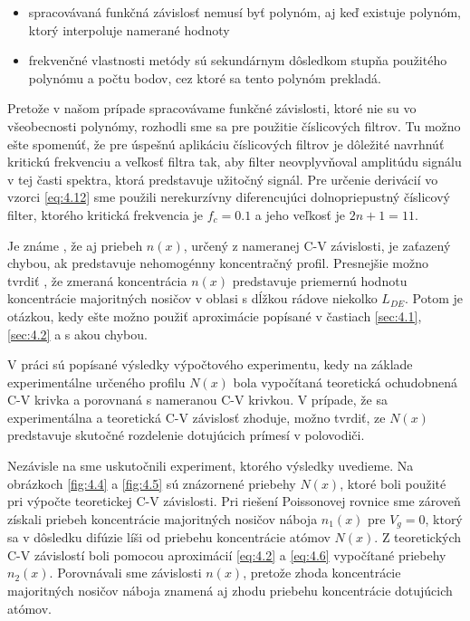 \begin{itemize}
\item spracovávaná funkčná závislosť nemusí byť polynóm, aj keď
  existuje polynóm, ktorý interpoluje namerané hodnoty
\item frekvenčné vlastnosti metódy sú sekundárnym dôsledkom stupňa
  použitého polynómu a počtu bodov, cez ktoré sa tento polynóm
  prekladá.
\end{itemize}

\par Pretože v našom prípade spracovávame funkčné závislosti, ktoré
nie su vo všeobecnosti polynómy, rozhodli sme sa pre použitie
číslicových filtrov. Tu možno ešte spomenúť, že pre úspešnú aplikáciu
číslicových filtrov je dôležité navrhnúť kritickú frekvenciu a veľkosť
filtra tak, aby filter neovplyvňoval amplitúdu signálu v tej časti
spektra, ktorá predstavuje užitočný signál. Pre určenie derivácií vo
vzorci \ref{eq:4.12} sme použili nerekurzívny diferencujúci
dolnopriepustný číslicový filter, ktorého kritická frekvencia je
$f_{c}=0.1$ a jeho veľkosť je $2n+1=11$.

\par Je známe \cite{4.18}, že aj priebeh $n(x)$, určený z nameranej
C-V závislosti, je zaťazený chybou, ak predstavuje nehomogénny
koncentračný profil. Presnejšie možno tvrdiť \cite{4.3}, že zmeraná
koncentrácia $n(x)$ predstavuje priemernú hodnotu koncentrácie
majoritných nosičov v oblasi s dĺžkou rádove niekolko $L_{DE}$. Potom je
otázkou, kedy ešte možno použiť aproximácie popísané v častiach
\ref{sec:4.1}, \ref{sec:4.2} a s akou chybou.

\par V práci \cite{4.22} sú popísané výsledky výpočtového experimentu,
kedy na základe experimentálne určeného profilu $N(x)$ bola vypočítaná
teoretická ochudobnená C-V krivka a porovnaná s nameranou C-V
krivkou. V prípade, že sa experimentálna a teoretická C-V závislosť
zhoduje, možno tvrdiť, ze $N(x)$ predstavuje skutočné rozdelenie
dotujúcich prímesí v polovodiči.

\par Nezávisle na \cite{4.22} sme uskutočnili experiment, ktorého
výsledky uvedieme. Na obrázkoch \ref{fig:4.4} a \ref{fig:4.5} sú
znázornené priebehy $N(x)$, ktoré boli použité pri výpočte teoretickej
C-V závislosti. Pri riešení Poissonovej rovnice sme zároveň získali
priebeh koncentrácie majoritných nosičov náboja $n_{1}(x)$ pre
$V_{g}=0$, ktorý sa v dôsledku difúzie líši od priebehu koncentrácie
atómov $N(x)$. Z teoretických C-V závislostí boli pomocou aproximácií
\ref{eq:4.2} a \ref{eq:4.6} vypočítané priebehy $n_{2}(x)$.
Porovnávali sme závislosti $n(x)$, pretože zhoda koncentrácie
majoritných nosičov náboja znamená aj zhodu priebehu koncentrácie
dotujúcich atómov.

